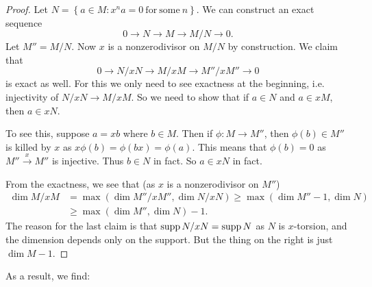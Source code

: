 \begin{proof} 
Let $N = \left\{a \in M: x^n a = 0 \ \mathrm{for \ some \ } n \right\}$. We can
construct an exact sequence
\[ 0 \to N \to M \to M/N \to 0.  \]
Let $M'' = M/N$.
Now $x$ is a nonzerodivisor on $M/N$ by construction. We claim that 
\[ 0 \to N/xN \to M/xM \to M''/xM'' \to 0  \]
is exact as well. For this we only need to see exactness at the beginning,
i.e. injectivity of $N/xN \to M/xM$. So
we need to show that if $a \in N$ and $a \in xM$, then $a \in x N$.

To see this, suppose $a = xb$ where $b \in M$. Then if $\phi: M \to M''$, then
$\phi(b) \in M''$ is killed by $x$ as $x \phi(b) = \phi(bx) = \phi(a)$.
This means that $\phi(b)=0$ as $M'' \stackrel{x}{\to} M''$ is injective. Thus
$b \in N$ in fact. So $a \in xN$ in fact.

From the exactness, we see that (as $x$ is a nonzerodivisor on $M''$)
\begin{align*} \dim M/xM & = \max (\dim M''/xM'', \dim N/xN) \geq \max(\dim M'' -1, \dim
N)\\ &  \geq \max( \dim M'', \dim N)-1  .  \end{align*}
The reason for the last claim is that $\operatorname{supp} N/xN = \operatorname{supp} N$ as $N$ is
$x$-torsion, and the dimension depends only on the support. But the thing on the right is just $\dim M -1$. 
\end{proof} 

As a result, we find:

